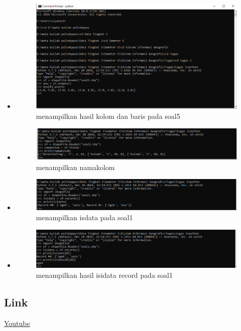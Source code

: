 \begin{itemize}
	\item 
	\begin{figure}[H]
		\includegraphics[width=12cm]{figures/1174039/tugas 3/hasilno8.PNG}
		\centering
		\caption{menampilkan hasil kolom dan baris pada soal5}
	\end{figure}
	
	\item 
	\begin{figure}[H]
		\includegraphics[width=12cm]{figures/1174039/tugas 3/hasilno9.PNG}
		\centering
		\caption{menampilkan namakolom}
	\end{figure}
	
	\item 
	\begin{figure}[H]
		\includegraphics[width=12cm]{figures/1174039/tugas 3/hasilno10.PNG}
		\centering
		\caption{menampilkan isdata pada soal1}
	\end{figure}	

	\item 
	\begin{figure}[H]
		\includegraphics[width=12cm]{figures/1174039/tugas 3/hasilno11.PNG}
		\centering
		\caption{menampilkan hasil isidata record pada soal1}
	\end{figure}
\end{itemize}

\subsection{Link}
\href{https://youtu.be/pSMhSqIgpUY}{Youtube}